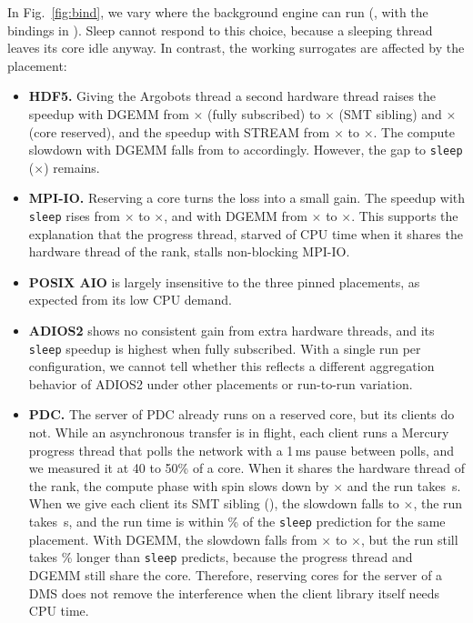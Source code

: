 In Fig.~\ref{fig:bind}, we vary where the background engine can run
(\srcPhaseBind, with the bindings in \srcBinding). Sleep cannot respond to
this choice, because a sleeping thread leaves its core idle anyway. In
contrast, the working surrogates are affected by the placement:
\begin{itemize}
  \item \textbf{HDF5.} Giving the Argobots thread a second hardware thread
        raises the speedup with DGEMM from \BindHdfDgemmFull$\times$ (fully
        subscribed) to \BindHdfDgemmSmt$\times$ (SMT sibling) and
        \BindHdfDgemmReserved$\times$ (core reserved), and the speedup with
        STREAM from \BindHdfStreamFull$\times$ to
        \BindHdfStreamReserved$\times$. The compute slowdown with DGEMM falls
        from \BindslowHdfDgemmFull to \BindslowHdfDgemmReserved accordingly.
        However, the gap to \texttt{sleep} (\BindHdfSleepReserved$\times$)
        remains.
  \item \textbf{MPI-IO.} Reserving a core turns the loss into a small gain.
        The speedup with \texttt{sleep} rises from \BindMpiioSleepFull$\times$
        to \BindMpiioSleepReserved$\times$, and with DGEMM from
        \BindMpiioDgemmFull$\times$ to \BindMpiioDgemmReserved$\times$. This
        supports the explanation that the progress thread, starved of CPU
        time when it shares the hardware thread of the rank, stalls
        non-blocking MPI-IO.
  \item \textbf{POSIX AIO} is largely insensitive to the three pinned
        placements, as expected from its low CPU demand.
  \item \textbf{ADIOS2} shows no consistent gain from extra hardware
        threads, and its \texttt{sleep} speedup is highest when fully
        subscribed. With a single run per configuration, we cannot tell
        whether this reflects a different aggregation behavior of ADIOS2
        under other placements or run-to-run variation.
  \item \textbf{PDC.} The server of PDC already runs on a reserved core,
        but its clients do not. While an asynchronous transfer is in
        flight, each client runs a Mercury progress thread that polls the
        network with a 1\,ms pause between polls, and we measured it at 40
        to 50\% of a core. When it shares the hardware thread of the rank,
        the compute phase with spin slows down by \PdcslowSpin$\times$ and
        the run takes \PdctotalSpin\,s. When we give each client its SMT
        sibling (\srcPhasePdc), the slowdown falls to \PdcsmtslowSpin$\times$, the run
        takes \PdcsmttotalSpin\,s, and the run time is within
        \PdcsmtexcpctSpin\% of the \texttt{sleep} prediction for the same
        placement. With DGEMM, the slowdown falls from
        \PdcslowDgemm$\times$ to \PdcsmtslowDgemm$\times$, but the run still
        takes \PdcsmtexcpctDgemm\% longer than \texttt{sleep} predicts,
        because the progress thread and DGEMM still share the core.
        Therefore, reserving cores for the server of a DMS does not remove
        the interference when the client library itself needs CPU time.
\end{itemize}
